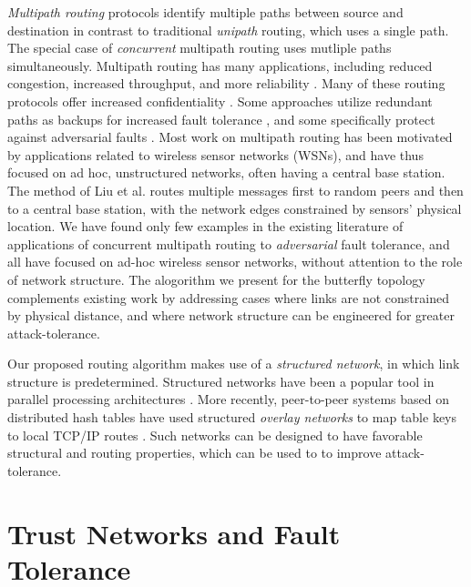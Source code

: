 \documentclass{sig-alternate-05-2015}
\begin{document}
{\em Multipath routing} protocols identify multiple paths between
source and destination
in contrast to traditional {\em unipath} routing, which uses
a single path.
The special case of {\em concurrent} multipath routing uses mutliple paths
simultaneously.
Multipath routing has many applications, including reduced congestion,
increased throughput, and more reliability
\cite{qadir_exploiting_2015}.
Many of these routing protocols offer increased confidentiality
\cite{zin_survey_2015}.
Some approaches utilize redundant paths as backups for increased
fault tolerance
\cite{alrajeh_secure_2013},
and some specifically protect against adversarial faults
\cite{kohno_improvement_2012, khalil_unmask:_2010, lou_h-spread:_2006}.
Most work on multipath routing has been motivated by applications related to
wireless sensor networks (WSNs),
and have thus focused on ad hoc, unstructured networks, often having a central
base station.
The method of Liu et al.
\cite{liu_secure_2012}
routes multiple messages first to random peers and then
to a central base station,
with the network edges constrained by sensors' physical location.
We have found only few examples in the existing literature of applications of
concurrent multipath routing to {\em adversarial} fault tolerance,
and all have focused on ad-hoc wireless sensor networks, without attention
to the role of network structure.
The alogorithm we present for the butterfly topology complements existing work
by addressing cases where links are not constrained by physical
distance,
and where network structure can be engineered for greater attack-tolerance.

Our proposed routing algorithm makes use of a
{\em structured network}, in which link structure is predetermined.
Structured networks have been a popular tool in parallel processing
architectures \cite{kshemkalyani_distributed_2008}.
More recently, peer-to-peer systems based on distributed hash tables have used
structured {\em overlay networks} to map table keys to local TCP/IP routes
\cite{lua_survey_2005,korzun_structured_2013}.
Such networks can be designed to have favorable structural and routing
properties,
which can be used to to improve attack-tolerance.

\section{Trust Networks and Fault Tolerance}
\label{sec-ft}
\end{document}
